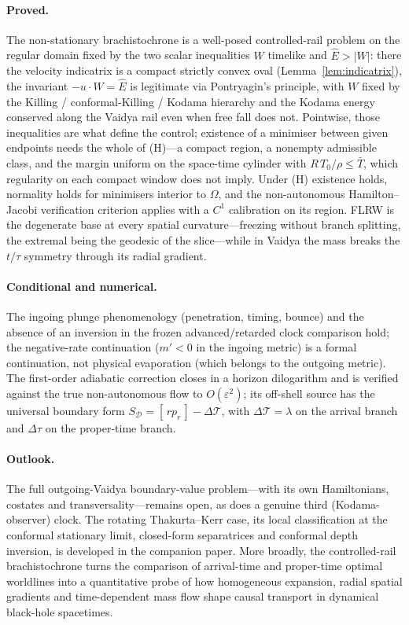\documentclass[12pt]{iopart}
\newcommand{\Ehat}{\hat E}
\theoremstyle{plain}
\theoremstyle{definition}
\theoremstyle{plain}
\theoremstyle{remark}
\begin{document}
\paragraph{Proved.} The non-stationary brachistochrone is a well-posed controlled-rail
problem on the regular domain fixed by the two scalar inequalities $W$ timelike and
$\Ehat>|W|$: there the velocity indicatrix is a compact strictly convex oval
(Lemma~\ref{lem:indicatrix}), the invariant $-u\cdot W=\Ehat$ is legitimate via
Pontryagin's principle, with $W$ fixed by the Killing / conformal-Killing / Kodama
hierarchy and the Kodama energy conserved along the Vaidya rail even when free fall does
not. Pointwise, those inequalities are what define the control; existence of a minimiser
between given endpoints needs the whole of (H)---a compact region, a nonempty admissible
class, and the margin uniform on the space-time cylinder with $R\,T_0/\rho\le\bar T$, which
regularity on each compact window does not imply. Under (H) existence holds, normality
holds for minimisers interior to $\Omega$, and the non-autonomous Hamilton--Jacobi
verification criterion applies with a $C^1$ calibration on its region. FLRW is the degenerate base at every spatial curvature---freezing
without branch splitting, the extremal being the geodesic of the slice---while in
Vaidya the mass breaks the $t/\tau$ symmetry through its radial gradient.

\paragraph{Conditional and numerical.} The ingoing plunge phenomenology (penetration,
timing, bounce) and the absence of an inversion in the frozen advanced/retarded clock
comparison hold; the negative-rate continuation ($m'<0$ in the ingoing metric) is a formal
continuation, not physical evaporation (which belongs to the outgoing metric). The
first-order adiabatic correction closes in a horizon dilogarithm and is verified against
the true non-autonomous flow to $O(\varepsilon^2)$; its off-shell source has the
universal boundary form $S_{\mathcal D}=[\,rp_r\,]-\Delta\mathcal T$, with
$\Delta\mathcal T=\lambda$ on the arrival branch and $\Delta\tau$ on the proper-time
branch.

\paragraph{Outlook.} The full outgoing-Vaidya boundary-value problem---with its own
Hamiltonians, costates and transversality---remains open, as does a genuine third
(Kodama-observer) clock. The rotating Thakurta--Kerr case, its local classification at the
conformal stationary limit, closed-form separatrices and conformal depth inversion, is developed in the companion
paper. More broadly, the controlled-rail brachistochrone turns the comparison of
arrival-time and proper-time optimal worldlines into a quantitative probe of how
homogeneous expansion, radial spatial gradients and time-dependent mass flow shape causal
transport in dynamical black-hole spacetimes.
\end{document}
